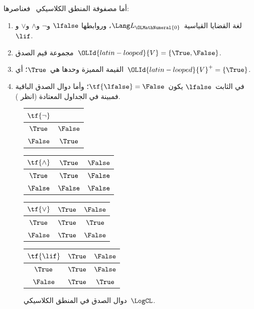 \documentclass[../../../include/open-logic-section]{subfiles}
\begin{document}
\begin{ex}
أما مصفوفة المنطق الكلاسيكي~\LogCL{} فعناصرها:
\begin{enumerate}
  \item لغة القضايا القياسية~$\Lang L_\OLMathNumeral{0}$، وروابطها
  $\lfalse$ و$\lnot$ و$\land$ و$\lor$ و$\lif$.
  \item مجموعة قيم الصدق~$\OLId{latin-looped}{V} = \{\True, \False\}$.
  \item القيمة المميزة وحدها هي~$\True$؛ أي~$\OLId{latin-looped}{V}^+ = \{\True\}$.
  \item في الثابت~$\lfalse$ يكون~$\tf{\lfalse} = \False$؛ وأما
  دوال الصدق الباقية فمبينة في الجداول المعتادة (انظر
  ).
\end{enumerate}
\begin{figure}
  \begin{center}
      \begin{tabular}{c|c}
        $\tf{\lnot}$ & \\
        \hline
        $\True$ & $\False$ \\
        $\False$ & $\True$
      \end{tabular}
      \quad
      \begin{tabular}{c|cc}
        $\tf{\land}$ & $\True$ & $\False$ \\
        \hline
        $\True$ & $\True$ & $\False$ \\
        $\False$ & $\False$ & $\False$
      \end{tabular}
      \quad
      \begin{tabular}{c|cc}
        $\tf{\lor}$ & $\True$ & $\False$ \\
        \hline
        $\True$ & $\True$ & $\True$ \\
        $\False$ & $\True$ & $\False$
      \end{tabular}
      \quad
      \begin{tabular}{c|cc}
        $\tf{\lif}$ & $\True$ & $\False$ \\
        \hline
        $\True$ & $\True$ & $\False$ \\
        $\False$ & $\True$ & $\True$
      \end{tabular}
    \end{center}
    \caption{دوال الصدق في المنطق الكلاسيكي~$\LogCL$.}
  \end{figure}
  \end{ex}
\end{document}

